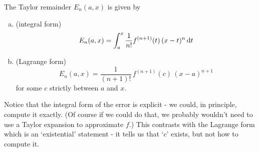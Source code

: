 \begin{theorem}
           \label{thm:TaylorRemainderA}
The Taylor remainder $E_n(a,x)$ is given by
\begin{enumerate}[(a)]
\item  (integral form) 
  \begin{equation*} 
    E_n(a,x)=\int_a^x \frac{1}{n!}f^{(n+1)}(t)\, (x-t)^n\,\mathrm{d}t
  \end{equation*}
\item (Lagrange form) 
  \begin{equation*}
    E_n(a,x)=\frac{1}{(n+1)!}\,f^{(n+1)}(c)\, (x-a)^{n+1}
  \end{equation*}
for some $c$ strictly between $a$ and $x$.
\end{enumerate}
\end{theorem}\noindent
Notice that the integral form of the error is explicit - we could, in principle, compute it exactly. (Of course if we could do that, we probably wouldn't need to use a Taylor 
expansion to approximate $f$.) This contrasts with the Lagrange form which is an `existential' statement - it tells us that `$c$' exists, but not how to compute it.

